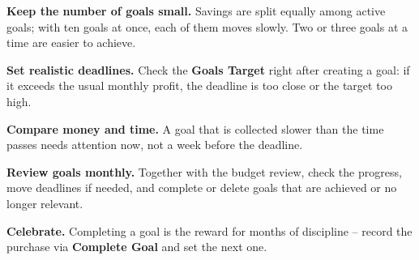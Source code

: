 \textbf{Keep the number of goals small.} Savings are split equally among active goals; with
ten goals at once, each of them moves slowly. Two or three goals at a time are easier to
achieve.

\textbf{Set realistic deadlines.} Check the \textbf{Goals Target} right after creating a
goal: if it exceeds the usual monthly profit, the deadline is too close or the target too
high.

\textbf{Compare money and time.} A goal that is collected slower than the time passes needs
attention now, not a week before the deadline.

\textbf{Review goals monthly.} Together with the budget review, check the progress, move
deadlines if needed, and complete or delete goals that are achieved or no longer relevant.

\textbf{Celebrate.} Completing a goal is the reward for months of discipline -- record the
purchase via \textbf{Complete Goal} and set the next one.
